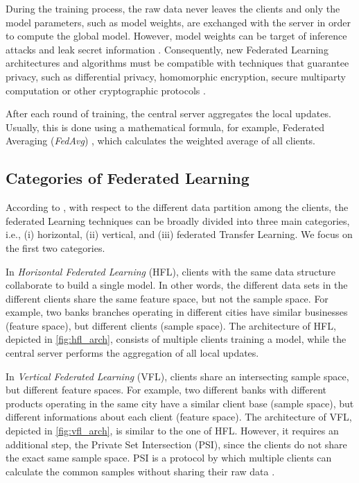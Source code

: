 During the training process, the raw data never leaves the clients and only the model parameters, such as model weights, are exchanged with the server in order to compute the global model. However, model weights can be target of inference attacks and leak secret information \cite{10.1145/3298981}.  Consequently, new Federated Learning architectures and algorithms must be compatible with techniques that guarantee privacy, such as differential privacy, homomorphic encryption, secure multiparty computation or other cryptographic protocols \cite{10.1145/3298981}.

After each round of training, the central server aggregates the local updates. Usually, this is done using a mathematical formula, for example, Federated Averaging (\textit{FedAvg}) \cite{10.48550/arxiv.1602.05629}, which calculates the weighted average of all clients.



\subsection{Categories of Federated Learning}\label{background:archfl}

According to \cite{10.1145/3298981, 10.1145/3412357}, with respect to the different data partition among the clients, the federated Learning techniques can be broadly divided into three main categories, i.e., (i) 
horizontal, (ii) vertical, and (iii) federated Transfer Learning. We focus on the first two categories.

In \textit{Horizontal Federated Learning} (HFL), clients with the same data structure collaborate to build a single model. In other words, the different data sets in the different clients share the same feature space, but not the sample space. For example, two banks branches operating in different cities have similar businesses (feature space), but different clients (sample space). The architecture of HFL, depicted in \autoref{fig:hfl_arch}, consists of multiple clients training a model, while the central server performs the aggregation of all local updates.

In \textit{Vertical Federated Learning} (VFL), clients share an intersecting sample space, but different feature spaces. For example, two different banks with different products operating in the same city have a similar client base (sample space), but different informations about each client (feature space). The architecture of VFL, depicted in \autoref{fig:vfl_arch}, is similar to the one of HFL. However, it requires an additional step, the Private Set Intersection (PSI), since the clients do not share the exact same sample space. PSI is a protocol by which multiple clients can calculate the common samples without sharing their raw data \cite{wei2022vertical}.

